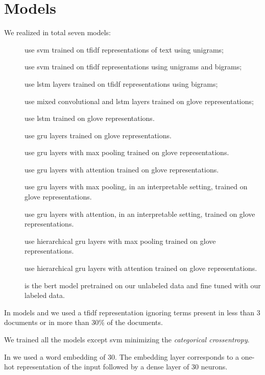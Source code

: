 \section{Models}\label{sec:models}
We realized in total seven models:
\begin{description}
\item[\svm] use \ac{svm} trained on \ac{tfidf} representations of text
  using unigrams;
\item[\svmb] use \ac{svm} trained on \ac{tfidf} representations
  using unigrams and bigrams;
\item[\lstmng] use \ac{lstm} layers trained on \ac{tfidf} representations using
  bigrams;
\item[\lstmc] use mixed convolutional and \ac{lstm} layers trained on
  \ac{glove} representations;
\item[\lstmb] use \ac{lstm} trained on \ac{glove} representations.
\item[\gru] use \ac{gru} layers trained on \ac{glove} representations.
\item[\maxp] use \ac{gru} layers with max pooling trained on \ac{glove}
  representations.
\item[\softmax] use \ac{gru} layers with attention trained on \ac{glove}
  representations.
\item[\maxi] use \ac{gru} layers with max pooling, in an interpretable setting, trained on \ac{glove}
  representations.
\item[\softmaxi] use \ac{gru} layers with attention, in an interpretable setting, trained on \ac{glove}
  representations.
\item[\maxh] use hierarchical \ac{gru} layers with max pooling trained on \ac{glove}
  representations.
\item[\softmaxh] use hierarchical \ac{gru} layers with attention trained on \ac{glove}
  representations.
\item[\bert] is the \ac{bert} model \cite{devlin2018bert} pretrained
  on our unlabeled data and fine tuned with our labeled data.
\end{description}

In models \svm{} and \svmb{} we used a \ac{tfidf}
representation ignoring terms present in less
than 3 documents or in
more than 30\% of the documents. 

We trained all the models except \ac{svm} minimizing
the \emph{categorical crossentropy}.

In \lstmng{} we used a word embedding of $30$. The
embedding layer corresponds to a one-hot representation of the input
followed by a dense layer of $30$ neurons.

